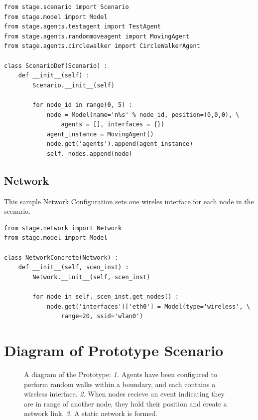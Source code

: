 \documentclass{article}
\begin{document}
\begin{verbatim}
from stage.scenario import Scenario
from stage.model import Model
from stage.agents.testagent import TestAgent
from stage.agents.randommoveagent import MovingAgent
from stage.agents.circlewalker import CircleWalkerAgent

class ScenarioDef(Scenario) :
    def __init__(self) :
        Scenario.__init__(self)

        for node_id in range(0, 5) :
            node = Model(name='n%s' % node_id, position=(0,0,0), \
                agents = [], interfaces = {})
            agent_instance = MovingAgent()
            node.get('agents').append(agent_instance)
            self._nodes.append(node)
\end{verbatim}

\subsection{Network}
This sample Network Configuration sets one wireles interface for each node in the scenario.
\begin{verbatim}
from stage.network import Network
from stage.model import Model

class NetworkConcrete(Network) :
    def __init__(self, scen_inst) :
        Network.__init__(self, scen_inst)

        for node in self._scen_inst.get_nodes() :
            node.get('interfaces')['eth0'] = Model(type='wireless', \
                range=20, ssid='wlan0')
\end{verbatim}

\section{Diagram of Prototype Scenario}

\begin{figure}
    \centering
    
    \caption[Prototype Use Case Diagram]%
    {A diagram of the Prototype: \emph{1.} Agents have been configured to perform random walks within a boundary, and each contains a wireless interface. \emph{2.} When nodes recieve an event indicating they are in range of another node, they hold their position and create a network link. \emph{3.} A static network is formed.}   
\end{figure}
\end{document}
